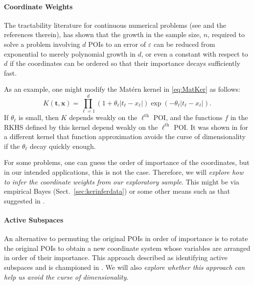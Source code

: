 \documentclass[11pt]{NSFamsart}
\newcommand{\bx}{{\boldsymbol{x}}}
\newcommand{\bt}{{\boldsymbol{t}}}
\def\abs#1{\ensuremath{\left \lvert #1 \right \rvert}}
\begin{document}
\paragraph*{Coordinate Weights}
The tractability literature for continuous numerical problems (see \cite{DicEtal14a,NovWoz08a, NovWoz10a, NovWoz12a} and the references therein), has shown that the growth in the sample size, $n$, required to solve a problem involving $d$ POIs to an error of $\varepsilon$ can be reduced from exponential to merely polynomial growth in $d$, or even a constant with respect to $d$ if the coordinates can be ordered so that their importance decays sufficiently fast.  

As an example, one might modify the Mat\'ern kernel in \eqref{eq:MatKer} as follows:
\begin{equation} \label{eq:ProdMatKer}
    K(\bt,\bx) = \prod_{\ell = 1}^d (1 + \theta_\ell \abs{t_\ell-x_\ell}) \exp(-\theta_\ell \abs{t_\ell-x_\ell}).
\end{equation}
If $\theta_\ell$ is small, then $K$ depends weakly on the $\ell^{\text{th}}$ POI, and the functions $f$ in the RKHS defined by this kernel depend weakly on the $\ell^{\text{th}}$ POI.  It was shown in \cite{FasHicWoz12b, FasHicWoz12a} for a different kernel that function approximation avoids the curse of dimensionality if the $\theta_\ell$ decay quickly enough.

For some problems, one can guess the order of importance of the coordinates, but in our intended applications, this is not the case.  Therefore, we will \emph{explore how to infer the coordinate weights from our exploratory sample}.  This might be via empirical Bayes (Sect.\ \ref{sec:kerinferdata}) or some other means such as that suggested in \cite{DinHic20a}.

\paragraph*{Active Subspaces}
An alternative to permuting the original POIs in order of importance is to rotate the original POIs to obtain a new coordinate system whose variables are arranged in order of their importance.  This approach described as identifying active subspaces and is championed in \cite{constantine2015active}.  We will also \emph{explore whether this approach can help us avoid the curse of dimensionality}.
\end{document}
